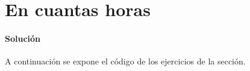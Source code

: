 \section{En cuantas horas}

    \paragraph{Solución}
    A continuación se expone el código de los ejercicios de la sección.
    
    
